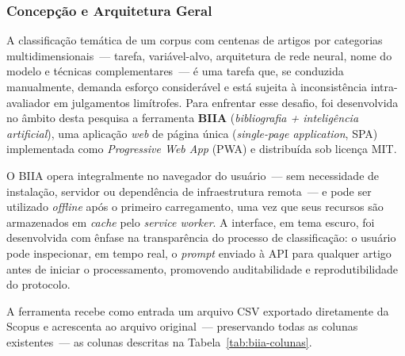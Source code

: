 \subsubsection{Concepção e Arquitetura Geral}

A classificação temática de um corpus com centenas de artigos por
categorias multidimensionais~--- tarefa, variável-alvo, arquitetura
de rede neural, nome do modelo e técnicas complementares~--- é uma
tarefa que, se conduzida manualmente, demanda esforço considerável
e está sujeita à inconsistência intra-avaliador em julgamentos
limítrofes. Para enfrentar esse desafio, foi desenvolvida no âmbito
desta pesquisa a ferramenta \textbf{BIIA} (\textit{bibliografia +
inteligência artificial}), uma aplicação \textit{web} de página
única (\textit{single-page application}, SPA) implementada como
\textit{Progressive Web App} (PWA) e distribuída sob licença MIT.

O BIIA opera integralmente no navegador do usuário~--- sem
necessidade de instalação, servidor ou dependência de infraestrutura
remota~--- e pode ser utilizado \textit{offline} após o primeiro
carregamento, uma vez que seus recursos são armazenados em
\textit{cache} pelo \textit{service worker}. A interface, em tema
escuro, foi desenvolvida com ênfase na transparência do processo de
classificação: o usuário pode inspecionar, em tempo real, o
\textit{prompt} enviado à API para qualquer artigo antes de iniciar
o processamento, promovendo auditabilidade e reprodutibilidade do
protocolo.

A ferramenta recebe como entrada um arquivo CSV exportado
diretamente da Scopus e acrescenta ao arquivo original~---
preservando todas as colunas existentes~--- as colunas descritas
na Tabela~\ref{tab:biia-colunas}.

